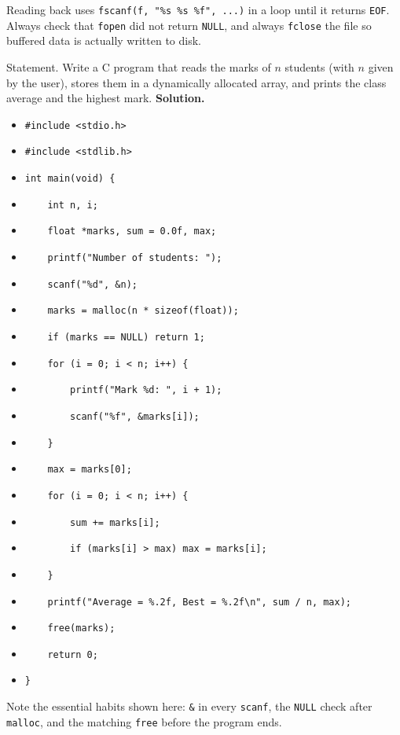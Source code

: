 \documentclass[11pt]{article}
\begin{document}
Reading back uses \texttt{fscanf(f, "\%s \%s \%f", ...)} in a loop until it returns \texttt{EOF}. Always check that \texttt{fopen} did not return \texttt{NULL}, and always \texttt{fclose} the file so buffered data is actually written to disk.

\begin{exoresolu}
Statement. Write a C program that reads the marks of $n$ students (with $n$ given by the user), stores them in a dynamically allocated array, and prints the class average and the highest mark.
\tcblower
\textbf{Solution.}
\begin{itemize}
\item \texttt{\#include <stdio.h>}
\item \texttt{\#include <stdlib.h>}
\item \texttt{int main(void) \{}
\item \texttt{~~~~int n, i;}
\item \texttt{~~~~float *marks, sum = 0.0f, max;}
\item \texttt{~~~~printf("Number of students: ");}
\item \texttt{~~~~scanf("\%d", \&n);}
\item \texttt{~~~~marks = malloc(n * sizeof(float));}
\item \texttt{~~~~if (marks == NULL) return 1;}
\item \texttt{~~~~for (i = 0; i < n; i++) \{}
\item \texttt{~~~~~~~~printf("Mark \%d: ", i + 1);}
\item \texttt{~~~~~~~~scanf("\%f", \&marks[i]);}
\item \texttt{~~~~\}}
\item \texttt{~~~~max = marks[0];}
\item \texttt{~~~~for (i = 0; i < n; i++) \{}
\item \texttt{~~~~~~~~sum += marks[i];}
\item \texttt{~~~~~~~~if (marks[i] > max) max = marks[i];}
\item \texttt{~~~~\}}
\item \texttt{~~~~printf("Average = \%.2f, Best = \%.2f\textbackslash n", sum / n, max);}
\item \texttt{~~~~free(marks);}
\item \texttt{~~~~return 0;}
\item \texttt{\}}
\end{itemize}
Note the essential habits shown here: \texttt{\&} in every \texttt{scanf}, the \texttt{NULL} check after \texttt{malloc}, and the matching \texttt{free} before the program ends.
\end{exoresolu}
\end{document}
